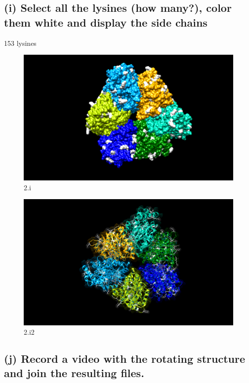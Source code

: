 \documentclass[a4paper, 12pt, one column]{article}
\begin{document}
\subsection*{(i) Select all the lysines (how many?), color them white and display the side chains}
153 lysines
\begin{figure}[H]
    \centering
    \includegraphics[width=.8\linewidth]{2_i.png}
    \caption{2.i}
    \label{fig:2_i.png}
\end{figure}
\begin{figure}[H]
    \centering
    \includegraphics[width=.8\linewidth]{2_i2.png}
    \caption{2.i2}
    \label{fig:2_i2.png}
\end{figure}
\subsection*{(j) Record a video with the rotating structure and join the resulting files.}


\end{document}
